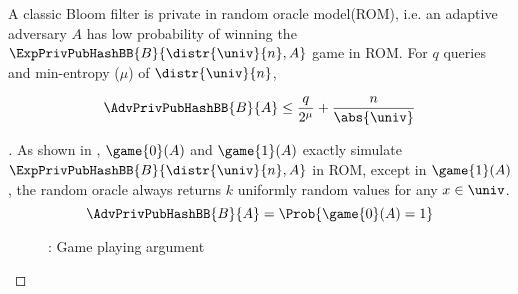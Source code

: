 \begin{theorem}\label{thm3}
A classic Bloom filter is private in random oracle model(ROM), i.e. an adaptive adversary $A$ has low probability of winning the $\ExpPrivPubHashBB{B}{\distr{\univ}{n},A}$ game in ROM. For $q$ queries and min-entropy ($\mu$) of $\distr{\univ}{n}$,

\begin{equation}
\AdvPrivPubHashBB{B}{A} \leq  \frac{q}{2^\mu} + \frac{n}{\abs{\univ}}
\end{equation}

\end{theorem}

\begin{proof}[]
As shown in , $\game{0}(A)$ and $\game{1}(A)$ exactly simulate $\ExpPrivPubHashBB{B}{\distr{\univ}{n}, A}$ in ROM, except in $\game{1}(A)$, the random oracle always returns $k$ uniformly random values for any $x \in \univ$.
\begin{equation}
\AdvPrivPubHashBB{B}{A} = \Prob{\game{0}(A)=1}\label{eq:0T3}
\end{equation}
\begin{figure}
\centering
{}
\caption{: Game playing argument}\label{fig:GameT3}
\end{figure}


\end{proof}
